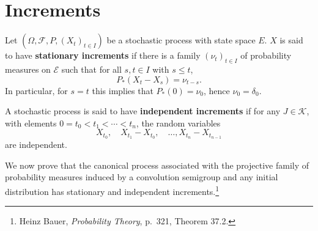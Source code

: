 \documentclass{article}
\theoremstyle{definition}
\begin{document}
\section{Increments}
Let $(\Omega,\mathscr{F},P,(X_t)_{t \in I})$ be a stochastic process 
with state space $E$. $X$ is said to have \textbf{stationary increments} if 
there is a family $(\nu_t)_{t \in I}$ of probability measures on $\mathscr{E}$ 
such that  for all $s,t \in I$ with $s \leq t$,
\[
P_*(X_t-X_s) = \nu_{t-s}.
\]
In particular, for $s=t$ this implies that $P_*(0)=\nu_0$, hence
$\nu_0=\delta_0$. 


A stochastic process is said to have \textbf{independent increments} if for
any $J \in \mathscr{K}$, with elements $0=t_0<t_1<\cdots<t_n$,
the random variables
\[
X_{t_0}, \quad X_{t_1}-X_{t_0}, \quad \ldots, X_{t_n} - X_{t_{n-1}}
\]
are independent. 

We now prove that the canonical process associated with the projective family of probability measures induced
by a convolution semigroup and any initial distribution has stationary and independent increments.\footnote{Heinz Bauer,
{\em Probability Theory}, p.~321, Theorem 37.2.}
\end{document}
